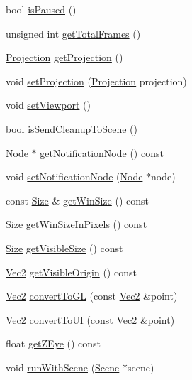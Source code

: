 \begin{DoxyCompactItemize}
bool \hyperlink{classDirector_a18b86013970deb49290996518f0ddae5}{is\+Paused} ()
\item 
unsigned int \hyperlink{classDirector_a2876d2ae1cc0b6832620f1144c38142a}{get\+Total\+Frames} ()
\item 
\hyperlink{classDirector_aaa3d9a0eac7c805d87ecba67c974fcf2}{Projection} \hyperlink{classDirector_a36e916d304e26fb6861b497806dc9980}{get\+Projection} ()
\item 
void \hyperlink{classDirector_a4cffcad9b7c5cbb16e5e0780ab5401b9}{set\+Projection} (\hyperlink{classDirector_aaa3d9a0eac7c805d87ecba67c974fcf2}{Projection} projection)
\item 
void \hyperlink{classDirector_aa93aca162b691b52a1ec1d206ca39a64}{set\+Viewport} ()
\item 
bool \hyperlink{classDirector_a882d9e2320d19b11b1cfab88a4439833}{is\+Send\+Cleanup\+To\+Scene} ()
\item 
\hyperlink{classNode}{Node} $\ast$ \hyperlink{classDirector_a33fe947ebf154c242198d3ad0d95cba4}{get\+Notification\+Node} () const
\item 
void \hyperlink{classDirector_ae94a4dda12c81955813683e016f769dd}{set\+Notification\+Node} (\hyperlink{classNode}{Node} $\ast$node)
\item 
const \hyperlink{classSize}{Size} \& \hyperlink{classDirector_af07668df4a8916e6eb0f79a93f6588fe}{get\+Win\+Size} () const
\item 
\hyperlink{classSize}{Size} \hyperlink{classDirector_a2afa5db94fce20cd07c9f4fe57708e21}{get\+Win\+Size\+In\+Pixels} () const
\item 
\hyperlink{classSize}{Size} \hyperlink{classDirector_ac17725c3dbb4876d745d897cb436b638}{get\+Visible\+Size} () const
\item 
\hyperlink{classVec2}{Vec2} \hyperlink{classDirector_a712d994af29f122e1b6496dd671718d5}{get\+Visible\+Origin} () const
\item 
\hyperlink{classVec2}{Vec2} \hyperlink{classDirector_a29371003ac8c3a6856eee412aa129d9c}{convert\+To\+GL} (const \hyperlink{classVec2}{Vec2} \&point)
\item 
\hyperlink{classVec2}{Vec2} \hyperlink{classDirector_a932324432ae4ccc8819db508951644e4}{convert\+To\+UI} (const \hyperlink{classVec2}{Vec2} \&point)
\item 
float \hyperlink{classDirector_ad245779e1e70b0195e761afc0582b1da}{get\+Z\+Eye} () const
\item 
void \hyperlink{classDirector_a893e73a440a7832097e858bf8b9dff8a}{run\+With\+Scene} (\hyperlink{classScene}{Scene} $\ast$scene)

\end{DoxyCompactItemize}
